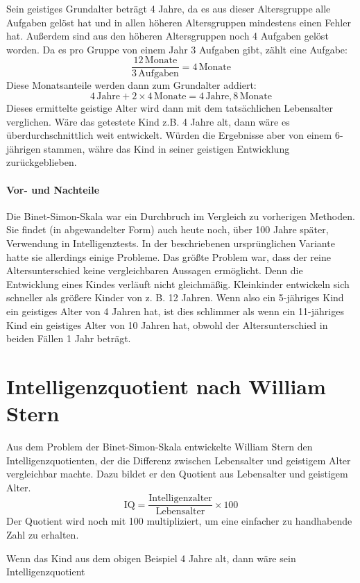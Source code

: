 Sein geistiges Grundalter beträgt 4 Jahre, da es aus dieser Altersgruppe alle Aufgaben gelöst hat und in allen höheren Altersgruppen mindestens einen Fehler hat. Außerdem sind aus den höheren Altersgruppen noch 4 Aufgaben gelöst worden. Da es pro Gruppe von einem Jahr 3 Aufgaben gibt, zählt eine Aufgabe:
$$ \frac{12\,\mathrm{Monate}}{3\,\mathrm{Aufgaben}} = 4\,\mathrm{Monate} $$
Diese Monatsanteile werden dann zum Grundalter addiert:
$$ 4\,\mathrm{Jahre} + 2 \times 4\,\mathrm{Monate} = 4\,\mathrm{Jahre}, 8\,\mathrm{Monate} $$
Dieses ermittelte geistige Alter wird dann mit dem tatsächlichen Lebensalter verglichen.
Wäre das getestete Kind z.B. 4 Jahre alt, dann wäre es überdurchschnittlich weit entwickelt. Würden die Ergebnisse aber
von einem 6-jährigen stammen, währe das Kind in seiner geistigen Entwicklung zurückgeblieben.

\paragraph{Vor- und Nachteile}
Die Binet-Simon-Skala war ein Durchbruch im Vergleich zu vorherigen Methoden. Sie findet (in abgewandelter Form) auch heute noch, über 100 Jahre später, Verwendung in Intelligenztests. In der beschriebenen ursprünglichen Variante hatte sie allerdings einige Probleme. Das größte Problem war, dass der reine Altersunterschied keine vergleichbaren Aussagen ermöglicht. Denn die Entwicklung eines Kindes verläuft nicht gleichmäßig. Kleinkinder entwickeln sich schneller als größere Kinder von z. B. 12 Jahren. Wenn also ein 5-jähriges Kind ein geistiges Alter von 4 Jahren hat, ist dies schlimmer als wenn ein 11-jähriges Kind ein geistiges Alter von 10 Jahren hat, obwohl der Altersunterschied in beiden Fällen 1 Jahr beträgt.

\section{Intelligenzquotient nach William Stern}
Aus dem Problem der Binet-Simon-Skala entwickelte William Stern den Intelligenzquotienten, der die Differenz zwischen Lebensalter und geistigem Alter vergleichbar machte. Dazu bildet er den Quotient aus Lebensalter und geistigem Alter.
$$ \mathrm{IQ} = \frac{\mathrm{Intelligenzalter}}{\mathrm{Lebensalter}} \times 100 $$
Der Quotient wird noch mit 100 multipliziert, um eine einfacher zu handhabende Zahl zu erhalten.

Wenn das Kind aus dem obigen Beispiel 4 Jahre alt, dann wäre sein Intelligenzquotient

